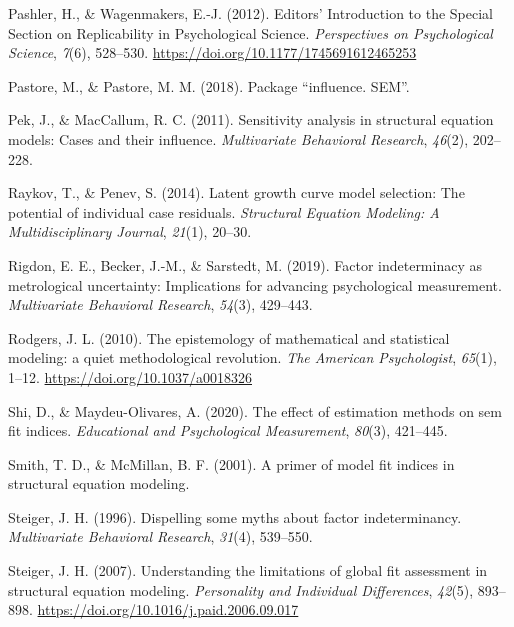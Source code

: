 \documentclass[
  english,
  doc]{apa6}
\newlength{\cslhangindent}
\newenvironment{cslreferences}%
  {\setlength{\parindent}{0pt}%
  \everypar{\setlength{\hangindent}{\cslhangindent}}\ignorespaces}%
  {\par}
\begin{document}
\begin{cslreferences}
\leavevmode\hypertarget{ref-Pashler2012a}{}%
Pashler, H., \& Wagenmakers, E.-J. (2012). Editors' Introduction to the Special Section on Replicability in Psychological Science. \emph{Perspectives on Psychological Science}, \emph{7}(6), 528--530. \url{https://doi.org/10.1177/1745691612465253}

\leavevmode\hypertarget{ref-pastore2018package}{}%
Pastore, M., \& Pastore, M. M. (2018). Package ``influence. SEM''.

\leavevmode\hypertarget{ref-pek2011sensitivity}{}%
Pek, J., \& MacCallum, R. C. (2011). Sensitivity analysis in structural equation models: Cases and their influence. \emph{Multivariate Behavioral Research}, \emph{46}(2), 202--228.

\leavevmode\hypertarget{ref-raykov2014latent}{}%
Raykov, T., \& Penev, S. (2014). Latent growth curve model selection: The potential of individual case residuals. \emph{Structural Equation Modeling: A Multidisciplinary Journal}, \emph{21}(1), 20--30.

\leavevmode\hypertarget{ref-rigdon2019factor}{}%
Rigdon, E. E., Becker, J.-M., \& Sarstedt, M. (2019). Factor indeterminacy as metrological uncertainty: Implications for advancing psychological measurement. \emph{Multivariate Behavioral Research}, \emph{54}(3), 429--443.

\leavevmode\hypertarget{ref-rodgers_epistemology_2010}{}%
Rodgers, J. L. (2010). The epistemology of mathematical and statistical modeling: a quiet methodological revolution. \emph{The American Psychologist}, \emph{65}(1), 1--12. \url{https://doi.org/10.1037/a0018326}

\leavevmode\hypertarget{ref-shi2020effect}{}%
Shi, D., \& Maydeu-Olivares, A. (2020). The effect of estimation methods on sem fit indices. \emph{Educational and Psychological Measurement}, \emph{80}(3), 421--445.

\leavevmode\hypertarget{ref-smith2001primer}{}%
Smith, T. D., \& McMillan, B. F. (2001). A primer of model fit indices in structural equation modeling.

\leavevmode\hypertarget{ref-steiger1996dispelling}{}%
Steiger, J. H. (1996). Dispelling some myths about factor indeterminancy. \emph{Multivariate Behavioral Research}, \emph{31}(4), 539--550.

\leavevmode\hypertarget{ref-Steiger2007}{}%
Steiger, J. H. (2007). Understanding the limitations of global fit assessment in structural equation modeling. \emph{Personality and Individual Differences}, \emph{42}(5), 893--898. \url{https://doi.org/10.1016/j.paid.2006.09.017}


\end{cslreferences}
\end{document}
